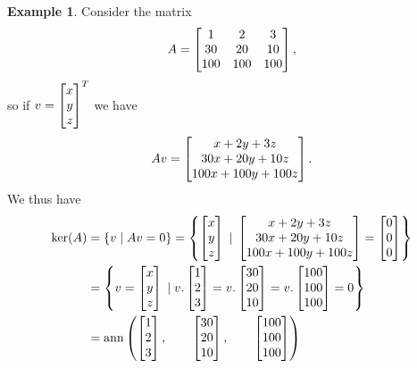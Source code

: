 \documentclass[reqno]{amsart}
\theoremstyle{definition}
\newtheorem{example}[theorem]{Example}
\begin{document}
\begin{example}\label{eg-ker-ann}
 Consider the matrix
 \[ A = \left[\begin{matrix} 1 & 2 & 3 \\ 30 & 20 & 10 \\ 100 & 100 & 100 \end{matrix}\right], \]
 so if $v=\left[\begin{matrix} x \\ y \\ z \end{matrix}\right]^T$ we have
 \[ A v = \left[\begin{matrix} x+2y+3z \\ 30x+20y+10z \\ 100x+100y+100z \end{matrix}\right]. \]
 We thus have 
 \begin{align*}
  \ker(A) &= \{v\;|\; Av=0\} 
   = \left\{\left[\begin{matrix} x \\ y \\ z\end{matrix}\right] \;|\;
       \left[\begin{matrix} x+2y+3z \\ 30x+20y+10z \\ 100x+100y+100z \end{matrix}\right] = 
       \left[\begin{matrix} 0 \\ 0 \\ 0 \end{matrix}\right] \right\} \\
  &= \left\{v = \left[\begin{matrix} x \\ y \\ z\end{matrix}\right] \;|\;
        v . \left[\begin{matrix} 1\\2\\3\end{matrix}\right] =
        v . \left[\begin{matrix} 30\\20\\10\end{matrix}\right] =
        v . \left[\begin{matrix} 100\\100\\100\end{matrix}\right] = 0
       \right\} \\
  &= \operatorname{ann}\left(
        \left[\begin{matrix} 1\\2\\3\end{matrix}\right],\qquad
        \left[\begin{matrix} 30\\20\\10\end{matrix}\right],\qquad
        \left[\begin{matrix} 100\\100\\100\end{matrix}\right]
       \right)
 \end{align*}
\end{example}
\end{document}
